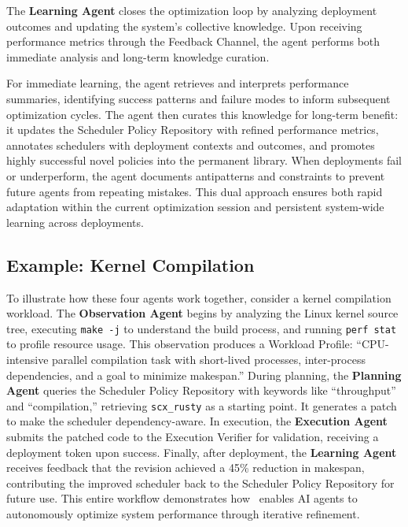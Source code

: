 The \textbf{Learning Agent} closes the optimization loop by analyzing deployment outcomes and updating the system's collective knowledge. Upon receiving performance metrics through the Feedback Channel, the agent performs both immediate analysis and long-term knowledge curation.

For immediate learning, the agent retrieves and interprets performance summaries, identifying success patterns and failure modes to inform subsequent optimization cycles. The agent then curates this knowledge for long-term benefit: it updates the Scheduler Policy Repository with refined performance metrics, annotates schedulers with deployment contexts and outcomes, and promotes highly successful novel policies into the permanent library. When deployments fail or underperform, the agent documents antipatterns and constraints to prevent future agents from repeating mistakes. This dual approach ensures both rapid adaptation within the current optimization session and persistent system-wide learning across deployments.


\subsection{Example: Kernel Compilation}

To illustrate how these four agents work together, consider a kernel compilation workload. The \textbf{Observation Agent} begins by analyzing the Linux kernel source tree, executing \texttt{make -j} to understand the build process, and running \texttt{perf stat} to profile resource usage. This observation produces a Workload Profile: ``CPU-intensive parallel compilation task with short-lived processes, inter-process dependencies, and a goal to minimize makespan.'' During planning, the \textbf{Planning Agent} queries the Scheduler Policy Repository with keywords like ``throughput'' and ``compilation,'' retrieving \texttt{scx\_rusty} as a starting point. It generates a patch to make the scheduler dependency-aware. In execution, the \textbf{Execution Agent} submits the patched code to the Execution Verifier for validation, receiving a deployment token upon success. Finally, after deployment, the \textbf{Learning Agent} receives feedback that the revision achieved a 45\% reduction in makespan, contributing the improved scheduler back to the Scheduler Policy Repository for future use. This entire workflow demonstrates how \agent\ enables AI agents to autonomously optimize system performance through iterative refinement.


